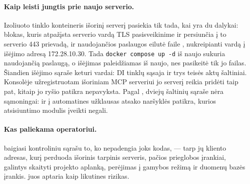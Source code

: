 \paragraph{Kaip leisti jungtis prie naujo serverio.} Izoliuoto tinklo konteineris išorinį serverį pasiekia
tik tada, kai yra du dalykai:  blokas, kuris atpažįsta serverio vardą TLS
pasisveikinime ir persiunčia į to serverio 443 prievadą, ir naudojančios paslaugos
 eilutė faile , nukreipianti vardą į išėjimo adresą
172.28.10.30. Tada \texttt{docker compose up -d} iš naujo sukuria naudojančią paslaugą, o išėjimas
paleidžiamas iš naujo, nes pasikeitė tik jo failas. Šiandien išėjimo sąraše keturi vardai: DI
tinklų sąsaja ir trys teisės aktų šaltiniai. Konsolėje užregistruotam išoriniam MCP serveriui jo
serverį reikia pridėti taip pat, kitaip jo ryšio patikra nepavyksta. Pagal
, dviejų šaltinių sąraše nėra sąmoningai:  ir
 į automatines užklausas atsako naršyklės patikra, kurios atsisiuntimo
modulis įveikti negali.

\paragraph{Kas paliekama operatoriui.}  baigiasi kontroliniu sąrašu
to, ko nepadengia joks kodas, --- tarp jų kliento adresas, kurį perduoda išorinis tarpinis
serveris, pačios prieglobos įrankiai, galintys skaityti projekto aplanką,
perėjimas į gamybos režimą ir duomenų bazės įrankis.  juos aptaria kaip
likutines rizikas.
